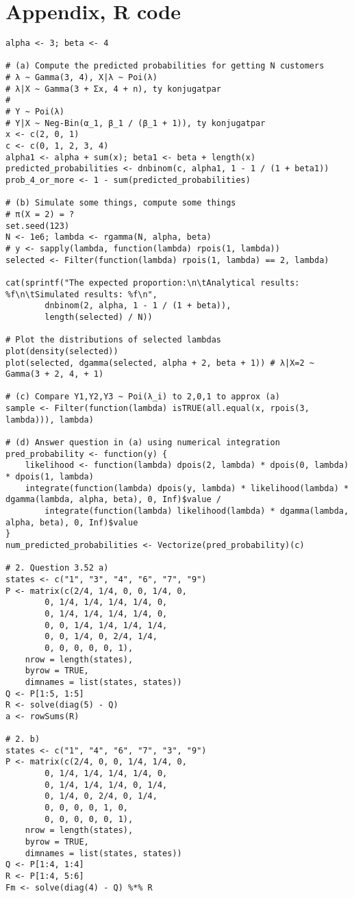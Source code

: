 \documentclass{article}
\begin{document}
\section{Appendix, R code}
\begin{verbatim}
alpha <- 3; beta <- 4

# (a) Compute the predicted probabilities for getting N customers
# λ ~ Gamma(3, 4), X|λ ~ Poi(λ)
# λ|X ~ Gamma(3 + Σx, 4 + n), ty konjugatpar
#
# Y ~ Poi(λ)
# Y|X ~ Neg-Bin(α_1, β_1 / (β_1 + 1)), ty konjugatpar
x <- c(2, 0, 1)
c <- c(0, 1, 2, 3, 4)
alpha1 <- alpha + sum(x); beta1 <- beta + length(x)
predicted_probabilities <- dnbinom(c, alpha1, 1 - 1 / (1 + beta1))
prob_4_or_more <- 1 - sum(predicted_probabilities)

# (b) Simulate some things, compute some things
# π(X = 2) = ?
set.seed(123)
N <- 1e6; lambda <- rgamma(N, alpha, beta)
# y <- sapply(lambda, function(lambda) rpois(1, lambda))
selected <- Filter(function(lambda) rpois(1, lambda) == 2, lambda)

cat(sprintf("The expected proportion:\n\tAnalytical results: %f\n\tSimulated results: %f\n",
		dnbinom(2, alpha, 1 - 1 / (1 + beta)),
		length(selected) / N))

# Plot the distributions of selected lambdas
plot(density(selected))
plot(selected, dgamma(selected, alpha + 2, beta + 1)) # λ|X=2 ~ Gamma(3 + 2, 4, + 1)

# (c) Compare Y1,Y2,Y3 ~ Poi(λ_i) to 2,0,1 to approx (a)
sample <- Filter(function(lambda) isTRUE(all.equal(x, rpois(3, lambda))), lambda)

# (d) Answer question in (a) using numerical integration
pred_probability <- function(y) {
	likelihood <- function(lambda) dpois(2, lambda) * dpois(0, lambda) * dpois(1, lambda)
	integrate(function(lambda) dpois(y, lambda) * likelihood(lambda) * dgamma(lambda, alpha, beta), 0, Inf)$value /
		integrate(function(lambda) likelihood(lambda) * dgamma(lambda, alpha, beta), 0, Inf)$value
}
num_predicted_probabilities <- Vectorize(pred_probability)(c)

# 2. Question 3.52 a)
states <- c("1", "3", "4", "6", "7", "9")
P <- matrix(c(2/4, 1/4, 0, 0, 1/4, 0,
		0, 1/4, 1/4, 1/4, 1/4, 0,
		0, 1/4, 1/4, 1/4, 1/4, 0,
		0, 0, 1/4, 1/4, 1/4, 1/4,
		0, 0, 1/4, 0, 2/4, 1/4,
		0, 0, 0, 0, 0, 1),
	nrow = length(states),
	byrow = TRUE,
	dimnames = list(states, states))
Q <- P[1:5, 1:5]
R <- solve(diag(5) - Q)
a <- rowSums(R)

# 2. b)
states <- c("1", "4", "6", "7", "3", "9")
P <- matrix(c(2/4, 0, 0, 1/4, 1/4, 0,
		0, 1/4, 1/4, 1/4, 1/4, 0,
		0, 1/4, 1/4, 1/4, 0, 1/4,
		0, 1/4, 0, 2/4, 0, 1/4,
		0, 0, 0, 0, 1, 0,
		0, 0, 0, 0, 0, 1),
	nrow = length(states),
	byrow = TRUE,
	dimnames = list(states, states))
Q <- P[1:4, 1:4]
R <- P[1:4, 5:6]
Fm <- solve(diag(4) - Q) %*% R
\end{verbatim}
\end{document}
